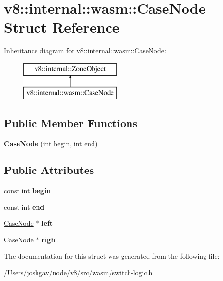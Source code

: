 \hypertarget{structv8_1_1internal_1_1wasm_1_1_case_node}{}\section{v8\+:\+:internal\+:\+:wasm\+:\+:Case\+Node Struct Reference}
\label{structv8_1_1internal_1_1wasm_1_1_case_node}
Inheritance diagram for v8\+:\+:internal\+:\+:wasm\+:\+:Case\+Node\+:\begin{figure}[H]
\begin{center}
\leavevmode
\includegraphics[height=2.000000cm]{structv8_1_1internal_1_1wasm_1_1_case_node}
\end{center}
\end{figure}
\subsection*{Public Member Functions}
\begin{DoxyCompactItemize}
\item 
{\bfseries Case\+Node} (int begin, int end)\hypertarget{structv8_1_1internal_1_1wasm_1_1_case_node_a803233277fb2724b42fbc17947f47b89}{}\label{structv8_1_1internal_1_1wasm_1_1_case_node_a803233277fb2724b42fbc17947f47b89}

\end{DoxyCompactItemize}
\subsection*{Public Attributes}
\begin{DoxyCompactItemize}
\item 
const int {\bfseries begin}\hypertarget{structv8_1_1internal_1_1wasm_1_1_case_node_a25dfb20fe65a74e5267ed09a688af530}{}\label{structv8_1_1internal_1_1wasm_1_1_case_node_a25dfb20fe65a74e5267ed09a688af530}

\item 
const int {\bfseries end}\hypertarget{structv8_1_1internal_1_1wasm_1_1_case_node_a0d5a12ee5903b101df830eaceab5f8b1}{}\label{structv8_1_1internal_1_1wasm_1_1_case_node_a0d5a12ee5903b101df830eaceab5f8b1}

\item 
\hyperlink{structv8_1_1internal_1_1wasm_1_1_case_node}{Case\+Node} $\ast$ {\bfseries left}\hypertarget{structv8_1_1internal_1_1wasm_1_1_case_node_a75ccd288130c33e0fc4a273a2d0a19f4}{}\label{structv8_1_1internal_1_1wasm_1_1_case_node_a75ccd288130c33e0fc4a273a2d0a19f4}

\item 
\hyperlink{structv8_1_1internal_1_1wasm_1_1_case_node}{Case\+Node} $\ast$ {\bfseries right}\hypertarget{structv8_1_1internal_1_1wasm_1_1_case_node_a66672c752c0714a2f30cfab7d9db8552}{}\label{structv8_1_1internal_1_1wasm_1_1_case_node_a66672c752c0714a2f30cfab7d9db8552}

\end{DoxyCompactItemize}


The documentation for this struct was generated from the following file\+:\begin{DoxyCompactItemize}
\item 
/\+Users/joshgav/node/v8/src/wasm/switch-\/logic.\+h\end{DoxyCompactItemize}

